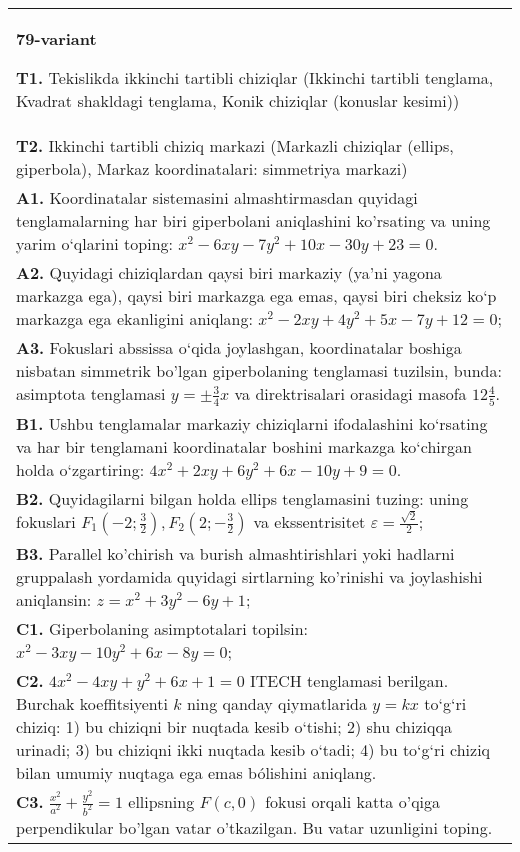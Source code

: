 \documentclass{article}
\begin{document}
\begin{tabular}{m{17cm}}
\textbf{79-variant}
\newline

\textbf{T1.} Tekislikda ikkinchi tartibli chiziqlar (Ikkinchi tartibli tenglama, Kvadrat shakldagi tenglama, Konik chiziqlar (konuslar kesimi)) \\
\textbf{T2.} Ikkinchi tartibli chiziq markazi (Markazli chiziqlar (ellips, giperbola), Markaz koordinatalari: simmetriya markazi) \\
\textbf{A1.} Koordinatalar sistemasini almashtirmasdan quyidagi tenglamalarning har biri giperbolani aniqlashini ko'rsating va uning yarim o‘qlarini toping: $x^2-6 x y-7 y^2+10 x-30 y+23=0$. \\
\textbf{A2.} Quyidagi chiziqlardan qaysi biri markaziy (ya’ni yagona markazga ega), qaysi biri markazga ega emas, qaysi biri cheksiz ko‘p markazga ega ekanligini aniqlang: $x^2-2 x y+4 y^2+5 x-7 y+12=0$; \\
\textbf{A3.} Fokuslari abssissa o‘qida joylashgan, koordinatalar boshiga nisbatan simmetrik bo'lgan giperbolaning tenglamasi tuzilsin, bunda: asimptota tenglamasi $y= \pm \frac{3}{4} x$ va direktrisalari orasidagi masofa $12 \frac{4}{5}$. \\
\textbf{B1.} Ushbu tenglamalar markaziy chiziqlarni ifodalashini ko‘rsating va har bir tenglamani koordinatalar boshini markazga ko‘chirgan holda o‘zgartiring: $4 x^2+2 x y+6 y^2+6 x-10 y+9=0$. \\
\textbf{B2.} Quyidagilarni bilgan holda ellips tenglamasini tuzing: uning fokuslari $F_1\left(-2; \frac{3}{2}\right), F_2\left(2;-\frac{3}{2}\right) $ va ekssentrisitet $\varepsilon=\frac{\sqrt{2}}{2}$; \\
\textbf{B3.} Parallel ko'chirish va burish almashtirishlari yoki hadlarni gruppalash yordamida quyidagi sirtlarning ko'rinishi va joylashishi aniqlansin: $z=x^2+3 y^2-6 y+1$; \\
\textbf{C1.} Giperbolaning asimptotalari topilsin: $x^2-3 x y-10 y^2+6 x-8 y=0$; \\
\textbf{C2.} $4 x^2-4 x y+y^2+6 x+1=0$ ITECH tenglamasi berilgan. Burchak koeffitsiyenti $k$ ning qanday qiymatlarida $y=kx$ to‘g‘ri chiziq: 1) bu chiziqni bir nuqtada kesib o‘tishi; 2) shu chiziqqa urinadi; 3) bu chiziqni ikki nuqtada kesib o‘tadi; 4) bu to‘g‘ri chiziq bilan umumiy nuqtaga ega emas bólishini aniqlang. \\
\textbf{C3.} $\frac{x^2}{a^2}+\frac{y^2}{b^2}=1$ ellipsning $F(c, 0)$ fokusi orqali katta o'qiga perpendikular bo'lgan vatar o'tkazilgan. Bu vatar uzunligini toping. \\

\end{tabular}
\vspace{1cm}
\end{document}
